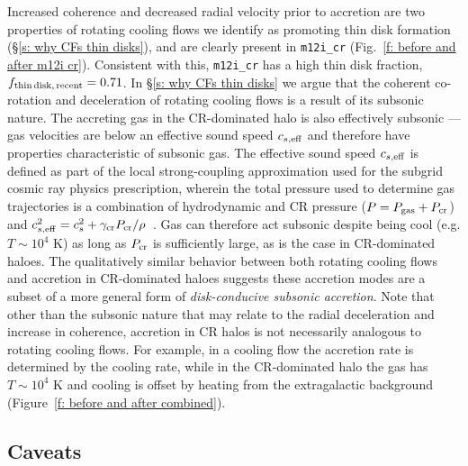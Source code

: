 \documentclass[fleqn,usenatbib]{mnras}
\newcommand{\fthin}{f_{\rm thin\,disk,\,recent}}
\begin{document}
Increased coherence and decreased radial velocity prior to accretion are two properties of rotating cooling flows we identify as promoting thin disk formation (\S\ref{s: why CFs thin disks}), and are clearly present in \texttt{m12i\_cr} (Fig.~\ref{f: before and after m12i cr}).
Consistent with this, \texttt{m12i\_cr} has a high thin disk fraction, $\fthin=0.71$.
In \S\ref{s: why CFs thin disks} we argue that the coherent co-rotation and deceleration of rotating cooling flows is a result of its subsonic nature.
The accreting gas in the CR-dominated halo is also effectively subsonic --- gas velocities are below an effective sound speed $c_{s,{\rm eff}}$ and therefore have properties characteristic of subsonic gas.
The effective sound speed $c_{s,{\rm eff}}$ is defined as part of the local strong-coupling approximation used for the subgrid cosmic ray physics prescription, wherein the total pressure used to determine gas trajectories is a combination of hydrodynamic and CR pressure ($P = P_{\rm gas} + P_{\rm cr}$) and $c^2_{s,{\rm eff}}=c^2_{s}+\gamma_{\rm cr} P_{\rm cr}/\rho$~\citep{Hopkins2020a}.
Gas can therefore act subsonic despite being cool (e.g. $T\sim10^4$ K) as long as $P_{\rm cr}$ is sufficiently large, as is the case in CR-dominated haloes.
The qualitatively similar behavior between both rotating cooling flows and accretion in CR-dominated haloes suggests these accretion modes are a subset of a more general form of \textit{disk-conducive subsonic accretion}.
Note that other than the subsonic nature that may relate to the radial deceleration and increase in coherence, accretion in CR halos is not necessarily analogous to rotating cooling flows.
For example, in a cooling flow the accretion rate is determined by the cooling rate, while in the CR-dominated halo the gas has $T \sim 10^4$ K and cooling is offset by heating from the extragalactic background (Figure~\ref{f: before and after combined}).

\subsection{Caveats}
\label{s: caveats}
\end{document}
